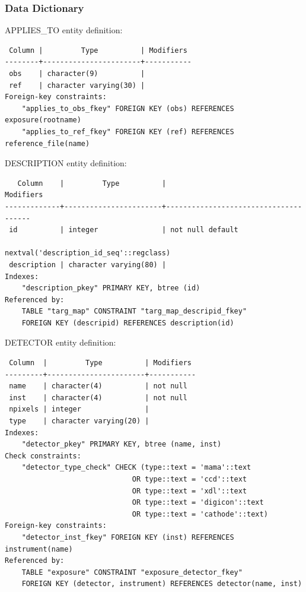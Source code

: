 \documentclass[a4paper,11pt]{article}
\begin{document}
\subsubsection{Data Dictionary}
\hrulefill
APPLIES\_TO entity definition:
\begin{verbatim}
 Column |         Type          | Modifiers 
--------+-----------------------+-----------
 obs    | character(9)          | 
 ref    | character varying(30) | 
Foreign-key constraints:
    "applies_to_obs_fkey" FOREIGN KEY (obs) REFERENCES exposure(rootname)
    "applies_to_ref_fkey" FOREIGN KEY (ref) REFERENCES reference_file(name)

\end{verbatim}

\hrulefill

DESCRIPTION entity definition:
\begin{verbatim}
   Column    |         Type          |                        Modifiers                         
-------------+-----------------------+--------------------------------------
 id          | integer               | not null default 
                                       nextval('description_id_seq'::regclass)
 description | character varying(80) | 
Indexes:
    "description_pkey" PRIMARY KEY, btree (id)
Referenced by:
    TABLE "targ_map" CONSTRAINT "targ_map_descripid_fkey" 
    FOREIGN KEY (descripid) REFERENCES description(id)

\end{verbatim}

\hrulefill

DETECTOR entity definition:
\begin{verbatim}
 Column  |         Type          | Modifiers 
---------+-----------------------+-----------
 name    | character(4)          | not null
 inst    | character(4)          | not null
 npixels | integer               | 
 type    | character varying(20) | 
Indexes:
    "detector_pkey" PRIMARY KEY, btree (name, inst)
Check constraints:
    "detector_type_check" CHECK (type::text = 'mama'::text 
                              OR type::text = 'ccd'::text 
                              OR type::text = 'xdl'::text 
                              OR type::text = 'digicon'::text 
                              OR type::text = 'cathode'::text)
Foreign-key constraints:
    "detector_inst_fkey" FOREIGN KEY (inst) REFERENCES instrument(name)
Referenced by:
    TABLE "exposure" CONSTRAINT "exposure_detector_fkey" 
    FOREIGN KEY (detector, instrument) REFERENCES detector(name, inst)

\end{verbatim}
\end{document}
